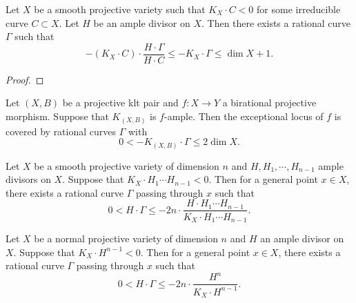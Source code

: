     \begin{theorem}\label{thm:rational_curve_on_smooth_variety_with_not_nef_K}
        Let \(X\) be a smooth projective variety such that \(K_X \cdot C < 0\) for some irreducible curve \(C \subset X\).
        Let \(H\) be an ample divisor on \(X\).
        Then there exists a rational curve \(\Gamma\) such that
        \[ -(K_X \cdot C) \cdot \frac{H\cdot \Gamma}{H \cdot C} \leq -K_X \cdot \Gamma \leq \dim X + 1. \]
    \end{theorem}
    \begin{proof}
    \end{proof}

    \begin{theorem}\label{thm:rational_curve_on_exceptional_locus}
        Let \((X,B)\) be a projective klt pair and \(f:X \to Y\) a birational projective morphism.
        Suppose that \(K_{(X,B)}\) is \(f\)-ample.
        Then the exceptional locus of \(f\) is covered by rational curves \(\Gamma\) with 
        \[ 0 < -K_{(X,B)} \cdot \Gamma \leq 2\dim X. \]
    \end{theorem}

    \begin{theorem}\label{thm:general_rational_curve_on_smooth_variety_with_negative_intersection}
        Let \(X\) be a smooth projective variety of dimension \(n\) and \(H, H_1,\cdots,H_{n-1}\) ample divisors on \(X\).
        Suppose that \(K_X\cdot H_1 \cdots H_{n-1} < 0\).
        Then for a general point \(x\in X\), there exists a rational curve \(\Gamma\) passing through \(x\) such that
        \[ 0 < H \cdot \Gamma \leq - 2n \cdot \frac{H\cdot H_1 \cdots H_{n-1}}{K_X \cdot H_1 \cdots H_{n-1}}. \]
    \end{theorem}

    \begin{proposition}\label{prop:general_rational_curve_on_klt_variety_with_negative_intersection}
        Let \(X\) be a normal projective variety of dimension \(n\) and \(H\) an ample divisor on \(X\).
        Suppose that \(K_X\cdot H^{n-1} < 0\).
        Then for a general point \(x\in X\), there exists a rational curve \(\Gamma\) passing through \(x\) such that
        \[ 0 < H \cdot \Gamma \leq - 2n \cdot \frac{H^n}{K_X \cdot H^{n-1}}. \]
    \end{proposition}
